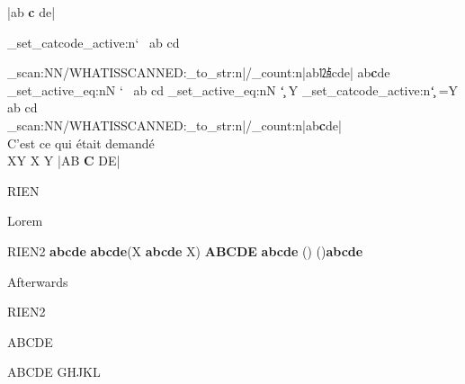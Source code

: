 \par\noindent

\CDRDebugOn
{}|ab  \textbf{c} de|
\def\My{a b c}
\makeatletter

\ExplSyntaxOn
\def\TEST{
  \CDRCode_scan:NN\DIDSCAN
}
\def\DIDSCAN#1{/WHAT\space IS\space SCANNED:\tl_to_str:n{#1}/\tl_count:n{#1}}
\ExplSyntaxOff
\makeatother
%
\bgroup
\ExplSyntaxOn
\char_set_catcode_active:n{`\ }
\ExplSyntaxOff
ab cd
\egroup
\TEST|ab㍤cde|
ab\textbf{c}de
\ExplSyntaxOn
\char_set_active_eq:nN { `\  } \FOO
\ExplSyntaxOff
\def\FOO{Y}
ab cd
\bgroup
\ExplSyntaxOn
\def\FOO{Y}
\char_set_active_eq:nN { `\c  } \FOO
\char_set_catcode_active:n{`\c }
=\FOO
\ExplSyntaxOff
ab cd
\egroup
\ttfamily\\
\TEST|ab\textbf    {c}de|\\
C'est ce qui était demandé\\
\newpage
XY
X%
%
Y%
\typeout{========}%
|AB \textbf{C} DE|

\CDRDebugOn
\begin{CDRBlock}
RIEN
\end{CDRBlock}
Lorem
\begin{CDRBlock} [
  pygments=false,
  show spaces,
  tab size=3,
  escape inside=(),
]%
RIEN2
\textbf{abcde}
    \textbf{abcde}(X \textbf{abcde} X)  \textbf{ABCDE}
	\textbf{abcde}
	(\bgroup\color{red})	(\egroup)\textbf{abcde}
\end{CDRBlock}
\lipsum[3]
Afterwards
\typeout{-------------------}
\begin{CDRBlock}
RIEN2
\def\foo#1{
  \textbf{#1}
}
\end{CDRBlock}
ABCDE
\trivlist\item ABCDE
\endtrivlist
GHJKL
\endinput

\ExplSyntaxOff
\makeatother


